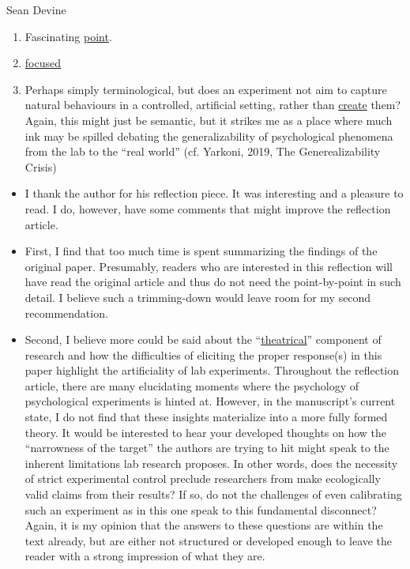 \documentclass[twocolumn, serif, authordate, review]{jote-article}
\begin{document}
\begin{paracol}{2}
\begin{reviewend}{Sean Devine}
    \begin{enumerate}[label=\textbf{\arabic*}), start=0]
    \item Fascinating \hyperref[sec:theatrical]{point}.
    \item \hyperref[sec:focussed]{focused}
    \item Perhaps simply terminological, but does an experiment not aim to capture natural behaviours in a controlled, artificial setting, rather than \hyperref[sec:create]{create} them? Again, this might just be semantic, but it strikes me as a place where much ink may be spilled debating the generalizability of psychological phenomena from the lab to the “real world” (cf. Yarkoni, 2019, The Generealizability Crisis) 
    \end{enumerate}
    \begin{itemize}
    \item I thank the author for his reflection piece. It was interesting and a pleasure to read. I do, however, have some comments that might improve the reflection article. 
    \item First, I find that too much time is spent summarizing the findings of the original paper. Presumably, readers who are interested in this reflection will have read the original article and thus do not need the point-by-point in such detail. I believe such a trimming-down would leave room for my second recommendation.
    \item Second, I believe more could be said about the ``\hyperref[sec:theatrical]{theatrical}'' component of research and how the difficulties of eliciting the proper response(s) in this paper highlight the artificiality of lab experiments. Throughout the reflection article, there are many elucidating moments where the psychology of psychological experiments is hinted at. However, in the manuscript’s current state, I do not find that these insights materialize into a more fully formed theory. It would be interested to hear your developed thoughts on how the “narrowness of the target” the authors are trying to hit might speak to the inherent limitations lab research proposes. In other words, does the necessity of strict experimental control preclude researchers from make ecologically valid claims from their results? If so, do not the challenges of even calibrating such an experiment as in this one speak to this fundamental disconnect? Again, it is my opinion that the answers to these questions are within the text already, but are either not structured or developed enough to leave the reader with a strong impression of what they are.

\end{itemize}
\end{reviewend}
\end{paracol}
\end{document}
